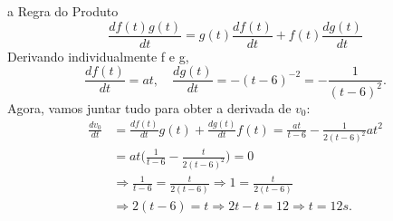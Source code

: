 \documentclass{article}
\begin{document}
  a Regra do Produto 
    $$
      \boxed{\frac{df(t)g(t)}{dt}= g(t)\frac{df(t)}{dt} + f(t)\frac{dg(t)}{dt}}
    $$
    Derivando individualmente f e g, 
      $$
        \frac{df(t)}{dt} = at, \quad \frac{dg(t)}{dt} = -(t-6)^{-2} = -\frac{1}{(t-6)^{2}}.
      $$
    Agora, vamos juntar tudo para obter a derivada de $v_{0}$: 
    \begin{align*}
      \frac{dv_{0}}{dt} &= \frac{df(t)}{dt}g(t) + \frac{dg(t)}{dt}f(t) = \frac{at}{t-6} - \frac{1}{2(t-6)^{2}}at^{2}\\
                        &= at\biggl(\frac{1}{t-6} - \frac{t}{2(t-6)^{2}}\biggr) = 0 \\
                        & \Rightarrow \frac{1}{t-6} = \frac{t}{2(t-6)} \Rightarrow 1 = \frac{t}{2(t-6)}\\
                        & \Rightarrow 2(t-6) = t \Rightarrow 2t - t = 12 \Rightarrow t = 12s.
    \end{align*}
\end{document}
